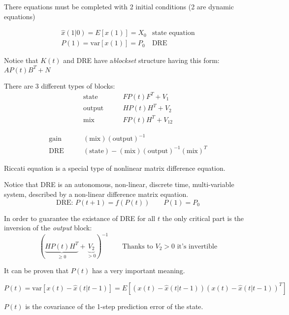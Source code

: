 There equations must be completed with 2 initial conditions (2 are dynamic equations)

\begin{align*}
    \hat{x}(1|0) = E[x(1)] = X_0 & \text{state equation} \\
    P(1) = \text{var}[x(1)] = P_0 & \text{DRE}
\end{align*}

\begin{remark}
    Notice that $K(t)$ and DRE have  a\emph{blockset} structure having this form: $AP(t)B^T+N$

    There are 3 different types of blocks:
    \begin{align*}
        \text{state} \qquad& FP(t)F^T+V_1 \\
        \text{output} \qquad& HP(t)H^T+V_2 \\
        \text{mix} \qquad& FP(t)H^T+V_{12}
    \end{align*}

    \begin{align*}
        \text{gain} \qquad& (\text{mix})(\text{output})^{-1} \\
        \text{DRE} \qquad& (\text{state}) - (\text{mix})(\text{output})^{-1}(\text{mix})^T
    \end{align*}
\end{remark}

\begin{remark}
    Riccati equation is a special type of nonlinear matrix difference equation.

    Notice that DRE is an autonomous, non-linear, discrete time, multi-variable system, described by a non-linear difference matrix equation.
    \[
        \text{DRE: } P(t+1) = f(P(t)) \qquad P(1) = P_0
    \]
\end{remark}

\begin{remark}
    In order to guarantee the existance of DRE for all $t$ the only critical part is the inversion of the \emph{output} block:
    \[
        ( \underbrace{HP(t)H^T}_{\ge 0} + \underbrace{V_2}_{>0})^{-1} \qquad \text{Thanks to $V_2>0$ it's invertible}
    \]
\end{remark}

\begin{remark}[Meaning of $P(t)$]
    It can be proven that $P(t)$ has a very important meaning.

    \[
        P(t) = \text{var}[x(t) - \hat{x}(t|t-1)] = E[(x(t) - \hat{x}(t|t-1))(x(t) - \hat{x}(t|t-1))^T]
    \]

    $P(t)$ is the covariance of the 1-step prediction error of the state.
\end{remark}
